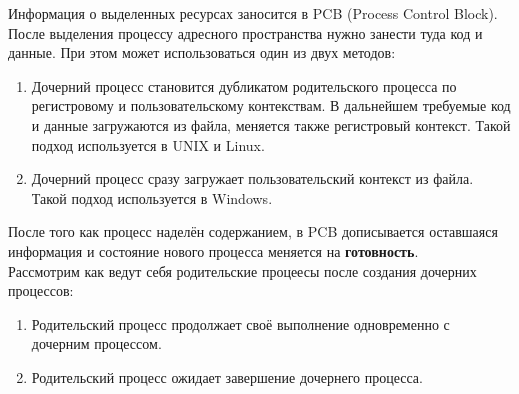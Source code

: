 \documentclass[a4paper]{article}
\begin{document}
Информация о выделенных ресурсах заносится в PCB (Process Control Block).\\
После выделения процессу адресного пространства нужно занести туда код и данные. При этом может использоваться один из двух методов:
\begin{enumerate}
	\item Дочерний процесс становится дубликатом родительского процесса по регистровому и пользовательскому контекствам. В дальнейшем требуемые код и данные загружаются из файла, меняется также регистровый контекст. Такой подход используется в UNIX и Linux.
	\item Дочерний процесс сразу загружает пользовательский контекст из файла. Такой подход используется в Windows.
\end{enumerate}
После того как процесс наделён содержанием, в PCB дописывается оставшаяся информация и состояние нового процесса меняется на \textbf{готовность}.\\
Рассмотрим как ведут себя родительские процеесы после создания дочерних процессов:
\begin{enumerate}
        \item Родительский процесс продолжает своё выполнение одновременно с дочерним процессом.
	\item Родительский процесс ожидает завершение дочернего процесса.
\end{enumerate}
\end{document}
